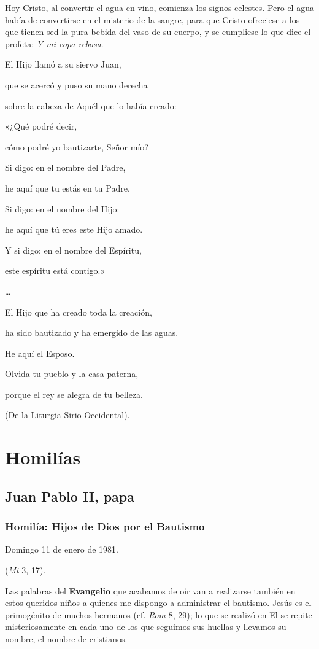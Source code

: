 \begin{body}
\begin{body}
{Hoy Cristo, al convertir el agua en vino, comienza los signos celestes. Pero el agua había de convertirse en el misterio de la sangre, para que Cristo ofreciese a los que tienen sed la pura bebida del vaso de su cuerpo, y se cumpliese lo que dice el profeta: \emph{Y mi copa rebosa}.

El Hijo llamó a su siervo Juan,

que se acercó y puso su mano derecha

sobre la cabeza de Aquél que lo había creado:

«¿Qué podré decir,

cómo podré yo bautizarte, Señor mío?

Si digo: en el nombre del Padre,

he aquí que tu estás en tu Padre.

Si digo: en el nombre del Hijo:

he aquí que tú eres este Hijo amado.

Y si digo: en el nombre del Espíritu,

este espíritu está contigo.»

\ldots{}

El Hijo que ha creado toda la creación,

ha sido bautizado y ha emergido de las aguas.

He aquí el Esposo.

Olvida tu pueblo y la casa paterna,

porque el rey se alegra de tu belleza.

(De la Liturgia Sirio-Occidental).


\section{Homilías}

\subsection{Juan Pablo II, papa}

\subsubsection{Homilía: Hijos de Dios por el Bautismo}

Domingo 11 de enero de 1981.

 (\emph{Mt} 3, 17).

Las palabras del \textbf{Evangelio} que acabamos de oír van a realizarse también en estos queridos niños a quienes me dispongo a administrar el bautismo. Jesús es el primogénito de muchos hermanos (cf. \emph{Rom} 8, 29); lo que se realizó en El se repite misteriosamente en cada uno de los que seguimos sus huellas y llevamos su nombre, el nombre de cristianos.

}
\end{body}
\end{body}
